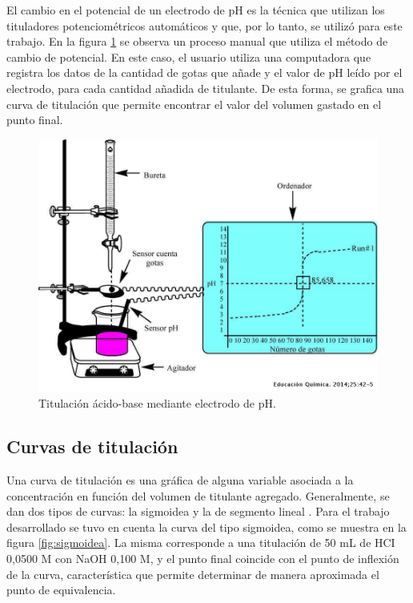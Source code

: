 El cambio en el potencial de un electrodo de pH es la técnica que utilizan los tituladores potenciométricos automáticos y que, por lo tanto, se utilizó para este trabajo. En la figura \ref{fig:titManualPot} se observa un proceso manual que utiliza el método de cambio de potencial. En este caso, el usuario utiliza una computadora que registra los datos de la cantidad de gotas que añade y el valor de pH leído por el electrodo, para cada cantidad añadida de titulante. De esta forma, se grafica una curva de titulación que permite encontrar el valor del volumen gastado en el punto final.


\begin{figure}[htbp]
	\centering
	\includegraphics[width=.7\textwidth]{./Figures/titulacionPotManual.jpeg}
	\caption{Titulación ácido-base mediante electrodo de pH\protect\footnotemark.}
	\label{fig:titManualPot}
\end{figure}


\subsection{Curvas de titulación}
\label{subsec:curvas}

Una curva de titulación es una gráfica de alguna variable asociada a la concentración en función del volumen de titulante agregado. Generalmente, se dan dos tipos de curvas: la sigmoidea y la de segmento lineal \citep{BOOK:1}.
Para el trabajo desarrollado se tuvo en cuenta la curva del tipo sigmoidea, como se muestra en la figura \ref{fig:sigmoidea}. La misma corresponde a una titulación de 50 mL de HCI 0,0500 M con NaOH 0,100 M, y el punto final coincide con el punto de inflexión de la curva, característica que permite determinar de manera aproximada el punto de equivalencia. 

